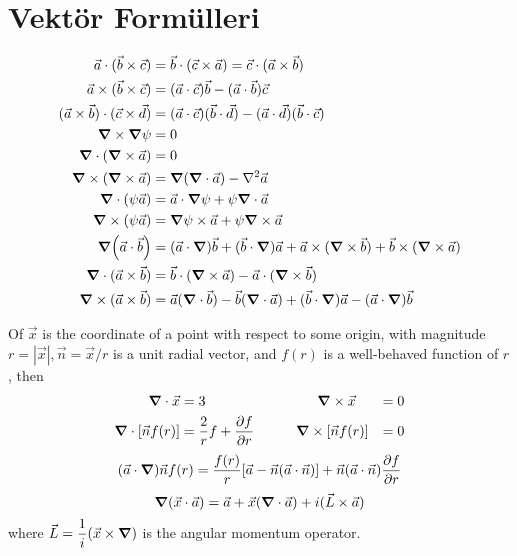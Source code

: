 \setcounter{chapter}{-2}
\chapter*{Vektör Formülleri}

\begin{align*}
\begin{aligned}
   \Vec{a} \cdot (\Vec{b} \times \Vec{c}) & = \Vec{b} \cdot (\Vec{c} \times \Vec{a}) = \Vec{c} \cdot (\Vec{a} \times \Vec{b}) \\
   \Vec{a} \times (\Vec{b} \times \Vec{c}) & = (\Vec{a} \cdot \Vec{c}) \Vec{b} - (\Vec{a} \cdot \Vec{b}) \Vec{c} \\
   (\Vec{a} \times \Vec{b}) \cdot (\Vec{c} \times \Vec{d}) &= (\Vec{a} \cdot \Vec{c}) (\Vec{b} \cdot \Vec{d}) - (\Vec{a} \cdot \Vec{d}) (\Vec{b} \cdot \Vec{c}) \\
   \grad \times \grad \psi & = 0 \\
   \grad \cdot ( \grad \times \Vec{a} ) & = 0 \\
   \grad \times (\grad \times \Vec{a}) & = \grad (\grad \cdot \Vec{a}) - \nabla^{2} \Vec{a} \\
   \grad \cdot (\psi \Vec{a}) &= \Vec{a} \cdot \grad \psi + \psi \grad \cdot \Vec{a}\\
   \grad \times (\psi \Vec{a}) &= \grad \psi \times \Vec{a} + \psi \grad \times \Vec{a}\\
   \grad (\Vec{a} \cdot \Vec{b}) &= (\Vec{a} \cdot \grad) \Vec{b} + (\Vec{b} \cdot \grad) \Vec{a} + \Vec{a} \times (\grad \times \Vec{b}) + \Vec{b} \times (\grad \times \Vec{a})\\
   \grad \cdot (\Vec{a} \times \Vec{b} ) &= \Vec{b} \cdot (\grad \times \Vec{a}) - \Vec{a} \cdot (\grad \times \Vec{b})\\
   \grad \times (\Vec{a} \times \Vec{b}) &= \Vec{a} (\grad \cdot \Vec{b}) - \Vec{b} (\grad \cdot \Vec{a}) + (\Vec{b} \cdot \grad) \Vec{a} - (\Vec{a} \cdot \grad) \Vec{b}
   \end{aligned}
\end{align*}

Of $\Vec{x}$ is the coordinate of a point with respect to some origin, with magnitude $r=|\Vec{x}|,\Vec{n} = \Vec{x}/r$ is a unit radial vector, and $f(r)$ is a well-behaved function of $r$, then
\begin{align*}
\begin{aligned}
\grad \cdot \Vec{x} &= 3 \qquad \qquad \qquad \qquad \grad \times \Vec{x} &= 0 \\
\grad \cdot [\Vec{n} f(r)] &= \dfrac{2}{r}f + \dfrac{\partial f}{\partial r} \qquad \quad \grad \times [\Vec{n} f(r)] & = 0
   \end{aligned}
\end{align*}
\[ (\Vec{a} \cdot \grad) \Vec{n} f(r) = \frac{f(r)}{r} [\Vec{a} - \Vec{n} (\Vec{a} \cdot \Vec{n})] + \Vec{n} (\Vec{a} \cdot \Vec{n}) \dfrac{\partial f}{\partial r} \]
\[ \grad (\Vec{x} \cdot \Vec{a}) = \Vec{a} + \Vec{x} (\grad \cdot \Vec{a}) + i (\Vec{L} \times \Vec{a}) \]
where $\Vec{L} = \dfrac{1}{i} (\Vec{x} \times \grad)$ is the angular momentum operator.